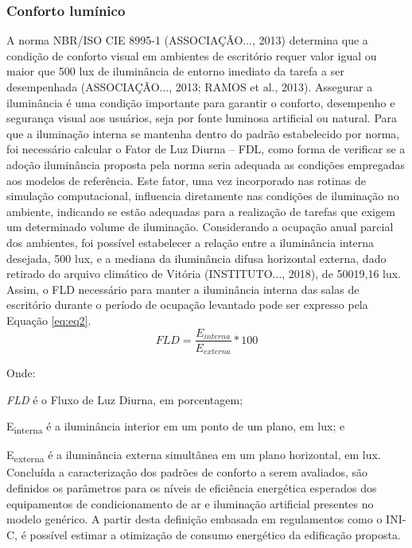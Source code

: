 \subsubsection{Conforto lumínico}
A norma NBR/ISO CIE 8995-1 (ASSOCIAÇÃO..., 2013) determina que a condição de conforto visual 
em ambientes de escritório requer valor igual ou maior que 500 lux de iluminância de entorno 
imediato da tarefa a ser desempenhada (ASSOCIAÇÃO..., 2013; RAMOS et al., 2013). Assegurar a 
iluminância é uma condição importante para garantir o conforto, desempenho e segurança visual 
aos usuários, seja por fonte luminosa artificial ou natural.\vspace*{0.3cm} \newline
Para que a iluminação interna se mantenha dentro do padrão estabelecido por norma, foi 
necessário calcular o Fator de Luz Diurna – FDL, como forma de verificar se a adoção 
iluminância proposta pela norma seria adequada as condições empregadas aos modelos de 
referência. Este fator, uma vez incorporado nas rotinas de simulação computacional, 
influencia diretamente nas condições de iluminação no ambiente, indicando se estão adequadas 
para a realização de tarefas que exigem um determinado volume de iluminação.\vspace*{0.3cm} \newline
Considerando a ocupação anual parcial dos ambientes, foi possível estabelecer a relação 
entre a iluminância interna desejada, 500 lux, e a mediana da iluminância difusa horizontal 
externa, dado retirado do arquivo climático de Vitória (INSTITUTO..., 2018), de 50019,16 lux. 
Assim, o FLD necessário para manter a iluminância interna das salas de escritório durante o 
período de ocupação levantado pode ser expresso pela Equação \ref{eq:eq2}.
\begin{equation}\label{eq:eq2}
    FLD=\frac{E_{interna}}{E_{externa}}*100
\end{equation}

Onde:\par
\setlength\parindent{1.5cm} \textit{FLD} é o Fluxo de Luz Diurna, em porcentagem;\par
\setlength\parindent{1.5cm} E\textsubscript{interna} é a iluminância interior em um ponto de um plano, em lux; e\par
\setlength\parindent{1.5cm} E\textsubscript{externa} é a iluminância externa simultânea em um plano horizontal, em lux.\vspace*{0.3cm} \newline
\noindent Concluída a caracterização dos padrões de conforto a serem avaliados, são definidos os 
parâmetros para os níveis de eficiência energética esperados dos equipamentos de 
condicionamento de ar e iluminação artificial presentes no modelo genérico. A partir desta 
definição embasada em regulamentos como o INI-C, é possível estimar a otimização de consumo 
energético da edificação proposta.